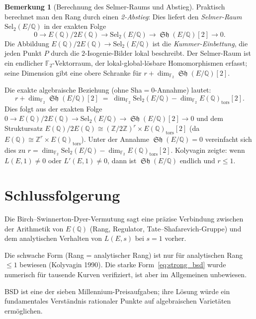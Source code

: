 \documentclass[12pt,a4paper]{amsart}
\theoremstyle{definition}
\newtheorem{remark}[theorem]{Bemerkung}
\newcommand{\Q}{\mathbb{Q}}
\DeclareMathOperator{\Sha}{\mathfrak{Sh}}
\begin{document}
\begin{remark}[Berechnung des Selmer-Raums und Abstieg]
Praktisch berechnet man den Rang durch einen \emph{2-Abstieg}:
Dies liefert den \emph{Selmer-Raum} $\mathrm{Sel}_2(E/\Q)$ in der exakten Folge
\[
  0 \to E(\Q)/2E(\Q) \to \mathrm{Sel}_2(E/\Q) \to \Sha(E/\Q)[2] \to 0.
\]
Die Abbildung $E(\Q)/2E(\Q) \to \mathrm{Sel}_2(E/\Q)$ ist die
\emph{Kummer-Einbettung}, die jeden Punkt $P$ durch die $2$-Isogenie-Bilder
lokal beschreibt.  Der Selmer-Raum ist ein endlicher $\mathbb{F}_2$-Vektorraum,
der lokal-global-l\"osbare Homomorphismen erfasst; seine Dimension gibt eine
obere Schranke f\"ur $r + \dim_{\mathbb{F}_2} \Sha(E/\Q)[2]$.

Die exakte algebraische Beziehung (ohne Sha$=0$-Annahme) lautet:
\[
  r + \dim_{\mathbb{F}_2} \Sha(E/\Q)[2]
  \;=\; \dim_{\mathbb{F}_2} \mathrm{Sel}_2(E/\Q)
        - \dim_{\mathbb{F}_2} E(\Q)_{\mathrm{tors}}[2].
\]
Dies folgt aus der exakten Folge $0 \to E(\Q)/2E(\Q) \to \mathrm{Sel}_2(E/\Q) \to \Sha(E/\Q)[2] \to 0$
und dem Struktursatz $E(\Q)/2E(\Q) \cong (\mathbb{Z}/2\mathbb{Z})^r \times E(\Q)_{\mathrm{tors}}[2]$
(da $E(\Q) \cong \mathbb{Z}^r \times E(\Q)_{\mathrm{tors}}$).
Unter der Annahme $\Sha(E/\Q) = 0$ vereinfacht sich dies zu
$r = \dim_{\mathbb{F}_2} \mathrm{Sel}_2(E/\Q) - \dim_{\mathbb{F}_2} E(\Q)_{\mathrm{tors}}[2]$.
Kolyvagin \cite{Kolyvagin1990} zeigte: wenn $L(E,1) \ne 0$ oder $L'(E,1) \ne 0$,
dann ist $\Sha(E/\Q)$ endlich und $r \le 1$.
\end{remark}

\section{Schlussfolgerung}

Die Birch--Swinnerton-Dyer-Vermutung sagt eine pr\"azise Verbindung zwischen
der Arithmetik von $E(\Q)$ (Rang, Regulator, Tate--Shafarevich-Gruppe)
und dem analytischen Verhalten von $L(E,s)$ bei $s=1$ vorher.

Die schwache Form (Rang = analytischer Rang) ist nur f\"ur analytischen
Rang $\le 1$ bewiesen (Kolyvagin 1990).
Die starke Form~\eqref{eq:strong_bsd} wurde numerisch f\"ur tausende Kurven
verifiziert, ist aber im Allgemeinen unbewiesen.

BSD ist eine der sieben Millennium-Preisaufgaben; ihre L\"osung w\"urde
ein fundamentales Verst\"andnis rationaler Punkte auf algebraischen
Variet\"aten erm\"oglichen.
\end{document}
